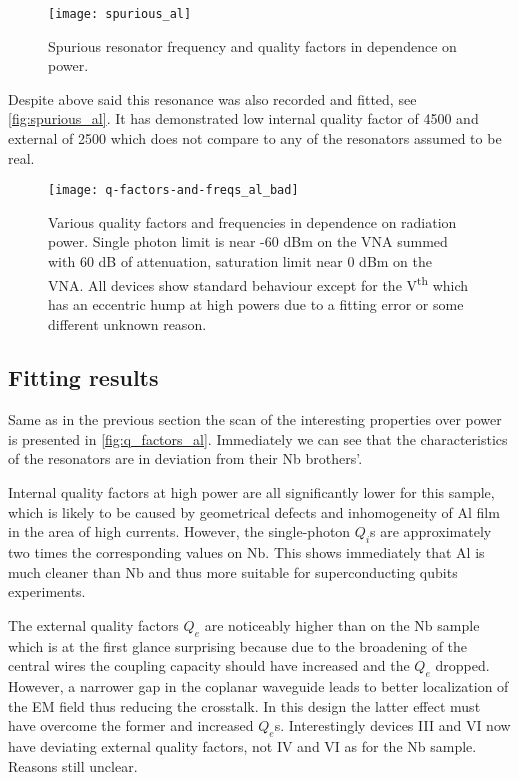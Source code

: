 \documentclass[12pt]{article}
\numberwithin{equation}{section}
\begin{document}
\begin{figure}
\centering
\texttt{[image: spurious\_al]}
\caption{Spurious resonator frequency and quality factors in dependence on power.}
\label{fig:spurious_al}
\end{figure}

Despite above said this resonance was also recorded and fitted, see \autoref{fig:spurious_al}. It has demonstrated low internal quality factor of 4500 and external of 2500 which does not compare to any of the resonators assumed to be real.

\begin{figure}
\hspace{-0.7cm}
\texttt{[image: q-factors-and-freqs\_al\_bad]}
\caption{Various quality factors and frequencies in dependence on radiation power. Single photon limit is near -60 dBm on the VNA summed with 60 dB of attenuation, saturation limit near 0 dBm on the VNA. All devices show standard behaviour except for the V\textsuperscript{th} which has an eccentric hump at high powers due to a fitting error or some different unknown reason.}
\label{fig:q_factors_al}
\end{figure}

\subsection{Fitting results}

Same as in the previous section the scan of the interesting properties over power is presented in \autoref{fig:q_factors_al}. Immediately we can see that the characteristics of the resonators are in deviation from their Nb brothers'. 

Internal quality factors at high power are all significantly lower for this sample, which is likely to be caused by geometrical defects and inhomogeneity of Al film in the area of high currents. However, the single-photon $Q_i$s are approximately two times the corresponding values on Nb. This shows immediately that Al is much cleaner than Nb and thus more suitable for superconducting qubits experiments. 

The external quality factors $Q_e$ are noticeably higher than on the Nb sample which is at the first glance surprising because due to the broadening of the central wires the coupling capacity should have increased and the $Q_e$ dropped. However, a narrower gap in the coplanar waveguide leads to better localization of the EM field thus reducing the crosstalk. In this design the latter effect must have overcome the former and increased $Q_e$s. Interestingly devices III and VI now have deviating external quality factors, not IV and VI as for the Nb sample. Reasons still unclear.
	
\end{document}
